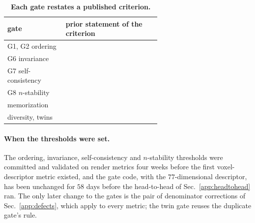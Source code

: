 \begin{table}[h]
\centering
\small
\setlength{\tabcolsep}{3pt}
\begin{tabular}{lp{0.62\linewidth}}
\toprule
gate & prior statement of the criterion \\
\midrule
G1, G2 ordering & \citet{heusel2017fid,binkowski2018kid,xu2018empirical,obray2022graphmetrics,thompson2022evaluation,jayasumana2024cmmd,jiralerspong2023fld} \\
G6 invariance & \citet{borji2019prosandcons,borji2022newdevelopments,kynkaanniemi2023imagenet,parmar2022aliased,ribeiro2020checklist} \\
G7 self-consistency & \citet{naeem2020prdc,binkowski2018kid,lopezpaz2017c2st,yang2019pointflow} \\
G8 $n$-stability & \citet{binkowski2018kid,chong2020unbiasedfid,jayasumana2024cmmd,jiralerspong2023fld,thompson2022evaluation} \\
memorization & \citet{meehan2020datacopying,alaa2022faithful,jiralerspong2023fld,stein2023exposing,somepalli2023replication} \\
diversity, twins & \citet{xu2018empirical,naeem2020prdc,jiralerspong2023fld} \\
\bottomrule
\end{tabular}
\caption{\textbf{Each gate restates a published criterion.}}
\label{tab:gateprov}
\end{table}

\paragraph{When the thresholds were set.} The ordering, invariance, self-consistency and $n$-stability thresholds were committed and validated on render
metrics four weeks before the first voxel-descriptor metric existed, and the gate code,
with the $77$-dimensional descriptor, has been unchanged for $58$ days before the
head-to-head of Sec.~\ref{app:headtohead} ran. The only later change to the gates is the
pair of denominator corrections of Sec.~\ref{app:defects}, which apply to every metric;
the twin gate reuses the duplicate gate's rule.

